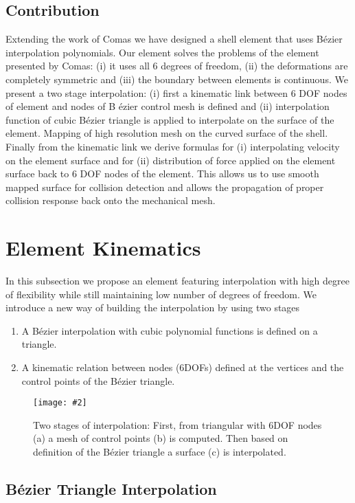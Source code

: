 \documentclass{egpubl}
\newcommand{\FigureW}[3]{%
\begin{figure*}[htb]
  \centering
  \texttt{[image: \#2]}
  \caption{\label{fig-#2}#3}
\end{figure*}}
\begin{document}
\subsection{Contribution}

Extending the work of Comas \cite{Comas2010c} we have designed a shell element that uses B\'ezier interpolation polynomials.
Our element solves the problems of the element presented by Comas:
(i) it uses all 6 degrees of freedom,
(ii) the deformations are completely symmetric and
(iii) the boundary between elements is continuous.
We present a two stage interpolation:
(i) first a kinematic link between 6 DOF nodes of element and nodes of B \'ezier control mesh is defined and
(ii) interpolation function of cubic B\'ezier triangle is applied to interpolate on the surface of the element.
Mapping of high resolution mesh on the curved surface of the shell.
Finally from the kinematic link we derive formulas for
(i) interpolating velocity on the element surface and for
(ii) distribution of force applied on the element surface back to 6 DOF nodes of the element.
This allows us to use smooth mapped surface for collision detection and allows the propagation of proper collision response back onto the mechanical mesh.



\section{Element Kinematics}\label{sec-kinematics} %

In this subsection we propose an element featuring interpolation with high degree of flexibility while still maintaining low number of degrees of freedom.
We introduce a new way of building the interpolation by using two stages 

\begin{enumerate}
    \item A B\'ezier interpolation with cubic polynomial functions is defined on a triangle.
    \item A kinematic relation between nodes (6DOFs) defined at the vertices and the control points of the B\'ezier triangle.
\end{enumerate}

\FigureW{0.8\linewidth}{stages}
{Two stages of interpolation: First, from triangular with 6DOF nodes (a) a mesh of control points (b) is computed.
Then based on definition of the B\'ezier triangle a surface (c) is interpolated.}

\subsection{B\'ezier Triangle Interpolation} %
\end{document}
